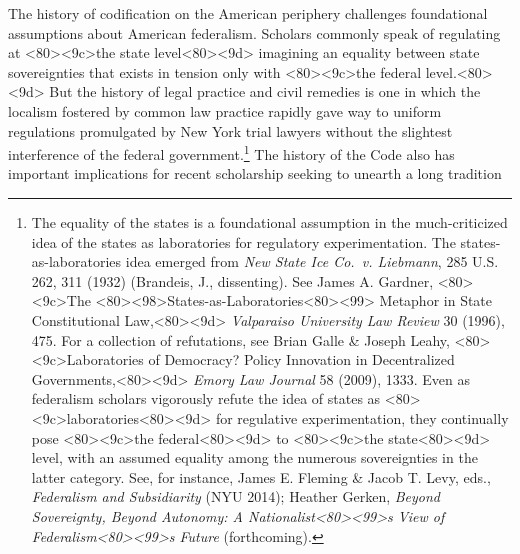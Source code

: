 \documentclass[12pt,]{article}
\let\rmarkdownfootnote\footnote%
\def\footnote{\protect\rmarkdownfootnote}
\begin{document}
The history of codification on the American periphery challenges
foundational assumptions about American federalism. Scholars commonly
speak of regulating at
\textless80\textgreater\textless9c\textgreater the state
level\textless80\textgreater\textless9d\textgreater{} imagining an
equality between state sovereignties that exists in tension only with
\textless80\textgreater\textless9c\textgreater the federal
level.\textless80\textgreater\textless9d\textgreater{} But the history
of legal practice and civil remedies is one in which the localism
fostered by common law practice rapidly gave way to uniform regulations
promulgated by New York trial lawyers without the slightest interference
of the federal government.\footnote{The equality of the states is a
  foundational assumption in the much-criticized idea of the states as
  laboratories for regulatory experimentation. The
  states-as-laboratories idea emerged from \emph{New State Ice Co.~v.
  Liebmann}, 285 U.S. 262, 311 (1932) (Brandeis, J., dissenting). See
  James A. Gardner, \textless80\textgreater\textless9c\textgreater The
  \textless80\textgreater\textless98\textgreater States-as-Laboratories\textless80\textgreater\textless99\textgreater{}
  Metaphor in State Constitutional
  Law,\textless80\textgreater\textless9d\textgreater{} \emph{Valparaiso
  University Law Review} 30 (1996), 475. For a collection of
  refutations, see Brian Galle \& Joseph Leahy,
  \textless80\textgreater\textless9c\textgreater Laboratories of
  Democracy? Policy Innovation in Decentralized
  Governments,\textless80\textgreater\textless9d\textgreater{}
  \emph{Emory Law Journal} 58 (2009), 1333. Even as federalism scholars
  vigorously refute the idea of states as
  \textless80\textgreater\textless9c\textgreater laboratories\textless80\textgreater\textless9d\textgreater{}
  for regulative experimentation, they continually pose
  \textless80\textgreater\textless9c\textgreater the
  federal\textless80\textgreater\textless9d\textgreater{} to
  \textless80\textgreater\textless9c\textgreater the
  state\textless80\textgreater\textless9d\textgreater{} level, with an
  assumed equality among the numerous sovereignties in the latter
  category. See, for instance, James E. Fleming \& Jacob T. Levy, eds.,
  \emph{Federalism and Subsidiarity} (NYU 2014); Heather Gerken,
  \emph{Beyond Sovereignty, Beyond Autonomy: A
  Nationalist\textless80\textgreater\textless99\textgreater s View of
  Federalism\textless80\textgreater\textless99\textgreater s Future}
  (forthcoming).} The history of the Code also has important
implications for recent scholarship seeking to unearth a long tradition
\end{document}
